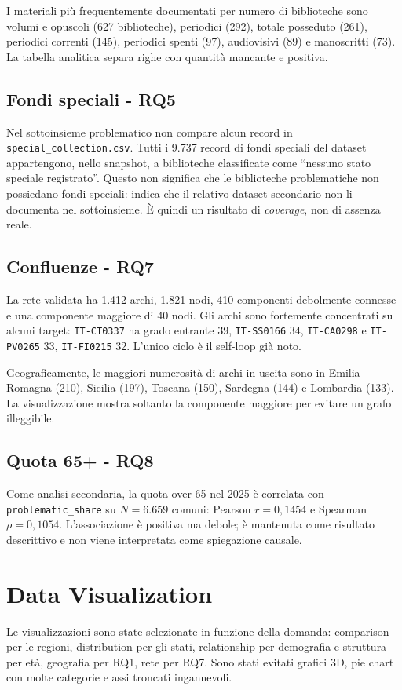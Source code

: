 \documentclass[11pt,a4paper]{article}
\begin{document}
I materiali più frequentemente documentati per numero di biblioteche sono volumi e opuscoli (627 biblioteche), periodici (292), totale posseduto (261), periodici correnti (145), periodici spenti (97), audiovisivi (89) e manoscritti (73). La tabella analitica separa righe con quantità mancante e positiva.

\subsection{Fondi speciali - RQ5}
Nel sottoinsieme problematico non compare alcun record in \texttt{special\_collection.csv}. Tutti i 9.737 record di fondi speciali del dataset appartengono, nello snapshot, a biblioteche classificate come ``nessuno stato speciale registrato''. Questo non significa che le biblioteche problematiche non possiedano fondi speciali: indica che il relativo dataset secondario non li documenta nel sottoinsieme. È quindi un risultato di \emph{coverage}, non di assenza reale.

\subsection{Confluenze - RQ7}
La rete validata ha 1.412 archi, 1.821 nodi, 410 componenti debolmente connesse e una componente maggiore di 40 nodi. Gli archi sono fortemente concentrati su alcuni target: \texttt{IT-CT0337} ha grado entrante 39, \texttt{IT-SS0166} 34, \texttt{IT-CA0298} e \texttt{IT-PV0265} 33, \texttt{IT-FI0215} 32. L'unico ciclo è il self-loop già noto.

Geograficamente, le maggiori numerosità di archi in uscita sono in Emilia-Romagna (210), Sicilia (197), Toscana (150), Sardegna (144) e Lombardia (133). La visualizzazione mostra soltanto la componente maggiore per evitare un grafo illeggibile.

\subsection{Quota 65+ - RQ8}
Come analisi secondaria, la quota over 65 nel 2025 è correlata con \texttt{problematic\_share} su $N=6.659$ comuni: Pearson $r=0{,}1454$ e Spearman $\rho=0{,}1054$. L'associazione è positiva ma debole; è mantenuta come risultato descrittivo e non viene interpretata come spiegazione causale.

\section{Data Visualization}
Le visualizzazioni sono state selezionate in funzione della domanda: comparison per le regioni, distribution per gli stati, relationship per demografia e struttura per età, geografia per RQ1, rete per RQ7. Sono stati evitati grafici 3D, pie chart con molte categorie e assi troncati ingannevoli.
\end{document}
